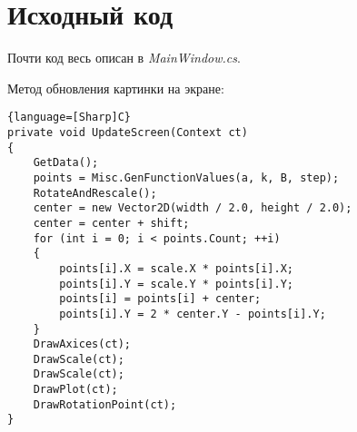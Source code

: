 \section{Исходный код}

Почти код весь описан в \textit{MainWindow.cs}.

Метод обновления картинки на экране:
\begin{lstlisting}{language=[Sharp]C}
private void UpdateScreen(Context ct)
{
    GetData();
    points = Misc.GenFunctionValues(a, k, B, step);
    RotateAndRescale();
    center = new Vector2D(width / 2.0, height / 2.0);
    center = center + shift;
    for (int i = 0; i < points.Count; ++i)
    {
        points[i].X = scale.X * points[i].X;
        points[i].Y = scale.Y * points[i].Y;
        points[i] = points[i] + center;
        points[i].Y = 2 * center.Y - points[i].Y;
    }
    DrawAxices(ct);
    DrawScale(ct);
    DrawScale(ct);
    DrawPlot(ct);
    DrawRotationPoint(ct);
}
\end{lstlisting}

